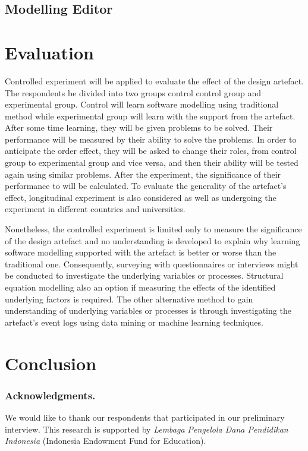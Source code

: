 \documentclass[runningheads,a4paper]{llncs}
\begin{document}
\subsection{Modelling Editor}

\section{Evaluation}
Controlled experiment will be applied to evaluate the effect of the design artefact. The respondents be divided into two groups control control group and experimental group. Control will learn software modelling using traditional method while experimental group will learn with the support from the artefact. After some time learning, they will be given problems to be solved. Their performance will be measured by their ability to solve the problems. In order to anticipate the order effect, they will be asked to change their roles, from control group to experimental group and vice versa, and then their ability will be tested again using similar problems. After the experiment, the significance of their performance to will be calculated. To evaluate the generality of the artefact's effect, longitudinal experiment is also considered  as well as undergoing the experiment in different countries and universities.

Nonetheless, the controlled experiment is limited only to measure the significance of the design artefact and no understanding is developed to explain why learning software modelling supported with the artefact is better or worse than the traditional one. Consequently, surveying with questionnaires or interviews might be conducted to investigate the underlying variables or processes. Structural equation modelling also an option if measuring the effects of the identified underlying factors is required. The other alternative method to gain understanding of underlying variables or processes is through investigating the artefact's event logs using data mining or machine learning techniques.

\section{Conclusion}
 

\subsubsection*{Acknowledgments.} We would like to thank our respondents that participated in our preliminary interview. This research is supported by \emph{Lembaga Pengelola Dana Pendidikan Indonesia} (Indonesia Endowment Fund for Education). 
\end{document}
